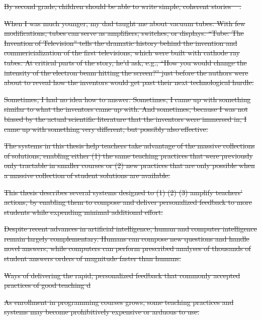 \documentclass[12pt,twoside]{mitthesis}
\providecommand{\DIFdeltex}[1]{{\protect\color{red}\sout{#1}}}                      %
\providecommand{\DIFdel}[1]{\texorpdfstring{\DIFdeltex{#1}}{}} %
\begin{document}
\DIFdel{By second grade, children should be able to write simple, coherent stories \mbox{%
\cite{http://www.webmd.com/parenting/features/when-should-kids-learn-read-write-math}}%
. 
}%

\DIFdel{When I was much younger, my dad taught me about vacuum tubes. With few modifications, tubes can serve as amplifiers, switches, or displays. ``Tube: The Invention of Television'' tells the dramatic history behind the invention and commericialization of the first televisions, which were built with cathode ray tubes. At critical parts of the story, he'd ask, e.g., ``How you would change the intensity of the electron beam hitting the screen?'' just before the authors were about to reveal how the inventors would get past their next technological hurdle.
}%

\DIFdel{Sometimes, I had no idea how to answer. Sometimes, I came up with something similar to what the inventors came up with. And sometimes, because I was not biased by the actual scientific literature that the inventors were immersed in, I came up with something very different, but possibly also effective. 
}%

\DIFdel{The systems in this thesis help teachers take advantage of the massive collections of solutions, enabling either (1) the same teaching practices that were previously only tractable in smaller courses or (2) new practices that are only possible when a massive collection of student solutions are available.
}%

\DIFdel{This thesis describes several systems designed to (1)  (2) (3) amplify teachers' actions, by enabling them to compose and deliver personalized feedback to more students while expending minimal additional effort. 
}%

\DIFdel{Despite recent advances in artificial intelligence, human and computer intelligence remain largely complementary. Humans can compose new questions and handle novel answers, while computers can perform prescribed analyses of thousands of student answers orders of magnitude faster than humans. 
}%

\DIFdel{Ways of delivering the rapid, personalized feedback that  commonly accepted practices of good teaching d
}%

\DIFdel{As enrollment in programming courses grows, some teaching practices and systems may become prohibitively expensive or arduous to use.
}%
\end{document}
